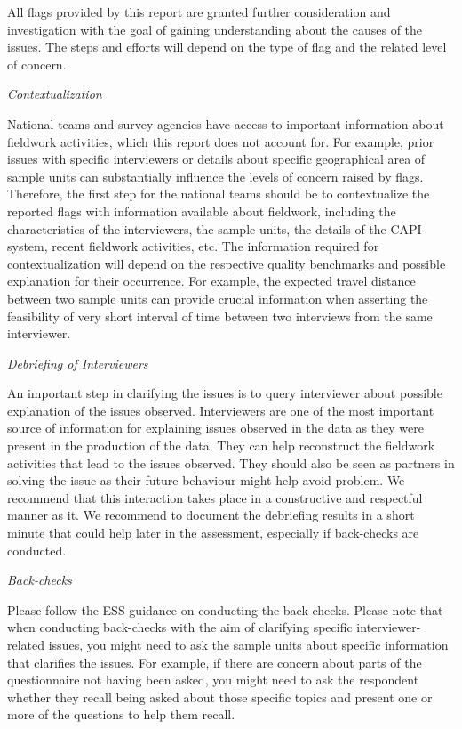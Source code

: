 \documentclass[
  11pt,
  a4paperpaper,
]{article}
\begin{document}
All flags provided by this report are granted further consideration and
investigation with the goal of gaining understanding about the causes of
the issues. The steps and efforts will depend on the type of flag and
the related level of concern.

\emph{Contextualization}

National teams and survey agencies have access to important information
about fieldwork activities, which this report does not account for. For
example, prior issues with specific interviewers or details about
specific geographical area of sample units can substantially influence
the levels of concern raised by flags. Therefore, the first step for the
national teams should be to contextualize the reported flags with
information available about fieldwork, including the characteristics of
the interviewers, the sample units, the details of the CAPI-system,
recent fieldwork activities, etc. The information required for
contextualization will depend on the respective quality benchmarks and
possible explanation for their occurrence. For example, the expected
travel distance between two sample units can provide crucial information
when asserting the feasibility of very short interval of time between
two interviews from the same interviewer.

\emph{Debriefing of Interviewers}

An important step in clarifying the issues is to query interviewer about
possible explanation of the issues observed. Interviewers are one of the
most important source of information for explaining issues observed in
the data as they were present in the production of the data. They can
help reconstruct the fieldwork activities that lead to the issues
observed. They should also be seen as partners in solving the issue as
their future behaviour might help avoid problem. We recommend that this
interaction takes place in a constructive and respectful manner as it.
We recommend to document the debriefing results in a short minute that
could help later in the assessment, especially if back-checks are
conducted.

\emph{Back-checks}

Please follow the ESS guidance on conducting the back-checks. Please
note that when conducting back-checks with the aim of clarifying
specific interviewer-related issues, you might need to ask the sample
units about specific information that clarifies the issues. For example,
if there are concern about parts of the questionnaire not having been
asked, you might need to ask the respondent whether they recall being
asked about those specific topics and present one or more of the
questions to help them recall.
\end{document}
